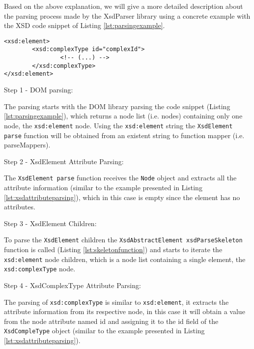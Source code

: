 \newpage

\noindent
Based on the above explanation, we will give a more detailed description about the parsing process made by the XsdParser library using a concrete example with the \ac{XSD} code snippet of Listing \ref{lst:parsingexample}.

\bigskip


\begin{minipage}{\linewidth}
\begin{lstlisting}[caption={Parsing Concrete Example},captionpos=b,label={lst:parsingexample}]
<xsd:element>
		<xsd:complexType id="complexId">
				<!-- (...) -->
		</xsd:complexType>
</xsd:element>
\end{lstlisting}
\end{minipage}


Step 1 - DOM parsing:

\noindent
The parsing starts with the \ac{DOM} library parsing the code snippet (Listing \ref{lst:parsingexample}), which returns a node list (i.e. nodes) containing only one node, the \texttt{xsd:element} node. Using the \texttt{xsd:element} string the \texttt{XsdElement parse} function will be obtained from an existent string to function mapper (i.e. parseMappers). 

Step 2 - XsdElement Attribute Parsing:

\noindent
The \texttt{XsdElement parse} function receives the \texttt{Node} object and extracts all the attribute information (similar to the example presented in Listing \ref{lst:xsdattributeparsing}), which in this case is empty since the element has no attributes. 

Step 3 - XsdElement Children:

\noindent
To parse the \texttt{XsdElement} children the \texttt{XsdAbstractElement xsdParseSkeleton} function is called (Listing \ref{lst:skeletonfunction}) and starts to iterate the \texttt{xsd:element} node children, which is a node list containing a single element, the \texttt{xsd:complexType} node. 

Step 4 - XsdComplexType Attribute Parsing:

\noindent
The parsing of \texttt{xsd:complexType} is similar to \texttt{xsd:element}, it extracts the attribute information from its respective node, in this case it will obtain a value from the node attribute named id and assigning it to the id field of the \texttt{XsdCompleType} object (similar to the example presented in Listing \ref{lst:xsdattributeparsing}). 

